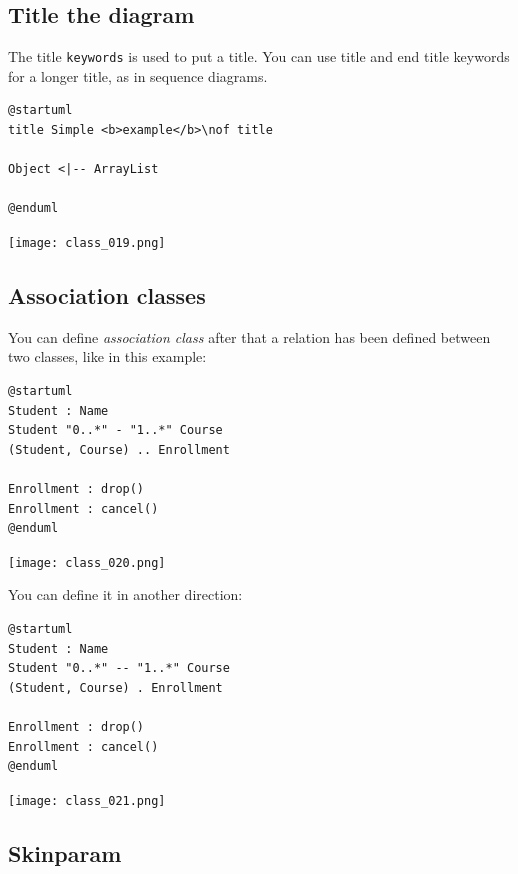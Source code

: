 \subsection{Title the diagram}

The title \texttt{keywords} is used to put a title.
You can use title and end title keywords for a longer title, as in sequence diagrams.

\begin{lstlisting}
@startuml
title Simple <b>example</b>\nof title 

Object <|-- ArrayList

@enduml
\end{lstlisting}
\begin{center}
\texttt{[image: class\_019.png]}
\end{center}

\newpage \subsection{Association classes}

You can define \textit{association class} after that a relation has been defined
between two classes, like in this example:

\begin{lstlisting}
@startuml
Student : Name
Student "0..*" - "1..*" Course
(Student, Course) .. Enrollment

Enrollment : drop()
Enrollment : cancel()
@enduml
\end{lstlisting}
\begin{center}
\texttt{[image: class\_020.png]}
\end{center}

You can define it in another direction:

\begin{lstlisting}
@startuml
Student : Name
Student "0..*" -- "1..*" Course
(Student, Course) . Enrollment

Enrollment : drop()
Enrollment : cancel()
@enduml
\end{lstlisting}
\begin{center}
\texttt{[image: class\_021.png]}
\end{center}

\newpage \subsection{Skinparam}

